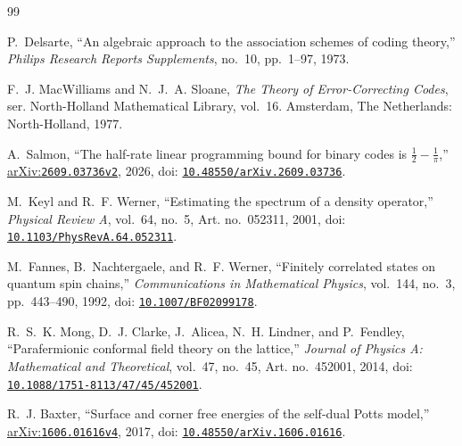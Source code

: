 \documentclass[12pt,letterpaper,onecolumn]{article}
\newcommand{\doi}[1]{\href{https://doi.org/#1}{\nolinkurl{#1}}}
\newcommand{\arxiv}[1]{\href{https://arxiv.org/abs/#1}{arXiv:\nolinkurl{#1}}}
\begin{document}
\begin{thebibliography}{99}


P.~Delsarte, ``An algebraic approach to the association schemes of coding theory,'' \emph{Philips Research Reports Supplements}, no.~10, pp.~1--97, 1973.

F.~J. MacWilliams and N.~J.~A. Sloane, \emph{The Theory of Error-Correcting Codes}, ser. North-Holland Mathematical Library, vol.~16. Amsterdam, The Netherlands: North-Holland, 1977.

A.~Salmon, ``The half-rate linear programming bound for binary codes is $\frac12-\frac1\pi$,'' \arxiv{2609.03736v2}, 2026, doi: \doi{10.48550/arXiv.2609.03736}.

M.~Keyl and R.~F. Werner, ``Estimating the spectrum of a density operator,'' \emph{Physical Review A}, vol.~64, no.~5, Art. no.~052311, 2001, doi: \doi{10.1103/PhysRevA.64.052311}.

M.~Fannes, B.~Nachtergaele, and R.~F. Werner, ``Finitely correlated states on quantum spin chains,'' \emph{Communications in Mathematical Physics}, vol.~144, no.~3, pp.~443--490, 1992, doi: \doi{10.1007/BF02099178}.

R.~S.~K. Mong, D.~J. Clarke, J.~Alicea, N.~H. Lindner, and P.~Fendley, ``Parafermionic conformal field theory on the lattice,'' \emph{Journal of Physics A: Mathematical and Theoretical}, vol.~47, no.~45, Art. no.~452001, 2014, doi: \doi{10.1088/1751-8113/47/45/452001}.

R.~J. Baxter, ``Surface and corner free energies of the self-dual Potts model,'' \arxiv{1606.01616v4}, 2017, doi: \doi{10.48550/arXiv.1606.01616}.
\end{thebibliography}
\end{document}
